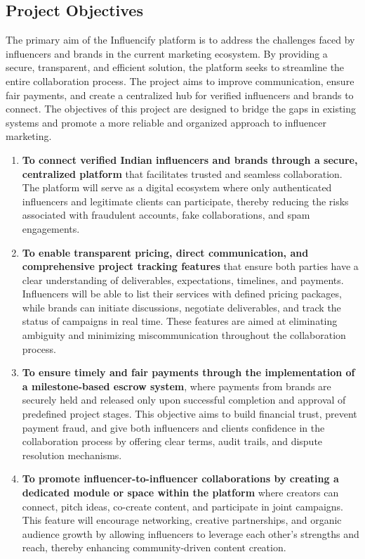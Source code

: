 \begin{justify}
\section{Project Objectives}

The primary aim of the Influencify platform is to address the challenges faced by influencers and brands in the current marketing ecosystem. By providing a secure, transparent, and efficient solution, the platform seeks to streamline the entire collaboration process. The project aims to improve communication, ensure fair payments, and create a centralized hub for verified influencers and brands to connect. The objectives of this project are designed to bridge the gaps in existing systems and promote a more reliable and organized approach to influencer marketing.

\begin{enumerate}
    \item 	\textbf{To connect verified Indian influencers and brands through a secure, centralized platform} that facilitates trusted and seamless collaboration. The platform will serve as a digital ecosystem where only authenticated influencers and legitimate clients can participate, thereby reducing the risks associated with fraudulent accounts, fake collaborations, and spam engagements.
    \item \textbf{To enable transparent pricing, direct communication, and comprehensive project tracking features} that ensure both parties have a clear understanding of deliverables, expectations, timelines, and payments. Influencers will be able to list their services with defined pricing packages, while brands can initiate discussions, negotiate deliverables, and track the status of campaigns in real time. These features are aimed at eliminating ambiguity and minimizing miscommunication throughout the collaboration process.
    \item \textbf{ To ensure timely and fair payments through the implementation of a milestone-based escrow system}, where payments from brands are securely held and released only upon successful completion and approval of predefined project stages. This objective aims to build financial trust, prevent payment fraud, and give both influencers and clients confidence in the collaboration process by offering clear terms, audit trails, and dispute resolution mechanisms.
    \item \textbf{	To promote influencer-to-influencer collaborations by creating a dedicated module or space within the platform} where creators can connect, pitch ideas, co-create content, and participate in joint campaigns. This feature will encourage networking, creative partnerships, and organic audience growth by allowing influencers to leverage each other’s strengths and reach, thereby enhancing community-driven content creation.
\end{enumerate}


\end{justify}
